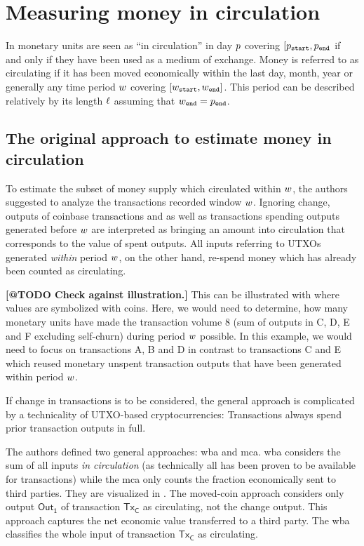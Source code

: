 \section{Measuring money in circulation}
\label{sec:measure}%

In \cite{pernice2019cryptocurrencies} monetary units are seen as ``in circulation'' in day \({p}\) covering \([{p}_{{\mathtt{start}}},{p}_{{\mathtt{end}}}\) if and only if they have been used as a medium of exchange. %
Money is referred to as circulating if it has been moved economically within the last day, month, year or generally any time period ${w}$ covering $[{w}_{\mathtt{start}} , {w}_{\mathtt{end}}]$. %
This period can be described relatively by its length \({\ell}\) assuming that \({w}_{\mathtt{end}} = {p}_{{\mathtt{end}}}\).%

\subsection{The original approach to estimate money in circulation}
\label{sec:orig_approach}%
To estimate the subset of money supply which circulated within ${w}$, the authors suggested to analyze the transactions recorded window ${w}$.  %
Ignoring change, outputs of coinbase transactions and as well as transactions spending outputs generated before ${w}$ are interpreted as bringing an amount into circulation that corresponds to the value of spent outputs.  %
All inputs referring to UTXOs generated \emph{within} period ${w}$, on the
other hand, re-spend money which has already been counted as circulating.%

\textbf{[@TODO Check against illustration.]}
This can be illustrated with  where values are symbolized with coins. %
Here, we would need to determine, how many monetary units have made the transaction volume $8$ (sum of outputs in C, D, E and F excluding self-churn) during period ${w}$ possible. %
In this example, we would need to focus on transactions A, B and D in contrast to transactions C and E which reused monetary unspent transaction outputs that have been generated within period ${w}$. %

If change in transactions is to be considered, the general approach is complicated by a technicality of UTXO-based cryptocurrencies: Transactions always spend prior transaction outputs in full. %

The authors defined two general approaches: \ac{wba} and \ac{mca}.  %
\ac{wba} considers the sum of all inputs \textit{in circulation} (as technically all has been proven to be available for transactions) while the \ac{mca} only counts the fraction economically sent to third parties.  %
%
They are visualized in .  %
The moved-coin approach considers only output $\mathsf{Out_1}$ of transaction $\mathsf{Tx_C}$ as circulating, not the change output.  %
This approach captures the net economic value transferred to a third party.  %
The \ac{wba} classifies the whole input of transaction $\mathsf{Tx_C}$ as circulating.  %

